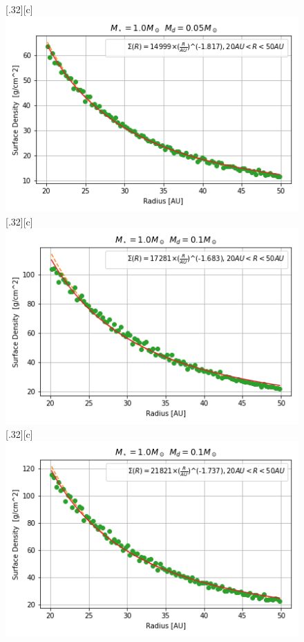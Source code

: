 \documentclass[aps,prb,twocolumn,superscriptaddress,floatfix,longbibliography]{revtex4-2}
\begin{document}
\begin{appendices}
\begin{figure}[!htbp]
  \subcaptionbox*{}[.32\linewidth][c]{%
    \includegraphics[width=\linewidth]{Graphs_1D/r_1s_0.05d_0.7q_1D.png}}\quad  
  \subcaptionbox*{}[.32\linewidth][c]{%
    \includegraphics[width=\linewidth]{Graphs_1D/r_1s_0.1d_0.3q_1D.png}}\quad
  \subcaptionbox*{}[.32\linewidth][c]{%
    \includegraphics[width=\linewidth]{Graphs_1D/r_1s_0.1d_0.5q_1D.png}}\quad

\end{figure}
\end{appendices}
\end{document}
